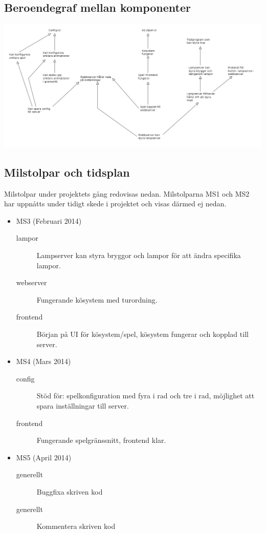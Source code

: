 \documentclass[a4paper,11pt]{article}
\begin{document}
\subsection{Beroendegraf mellan komponenter}

  \begin{center}
    \includegraphics[width=0.9\textheight,angle=90]{task-dependencies.png}
  \end{center}


\subsection{Milstolpar och tidsplan}

  Milstolpar under projektets gång redovisas nedan.  Milstolparna MS1 och MS2
  har uppnåtts under tidigt skede i projektet och visas därmed ej nedan.

  \begin{itemize}
    \item MS3 (Februari 2014)
      \begin{description}
        \item[lampor] Lampserver kan styra bryggor och lampor för att ändra
                      specifika lampor.
        \item[webserver] Fungerande kösystem med turordning.
        \item[frontend] Början på UI för kösystem/spel, kösystem fungerar och
                        kopplad till server.
      \end{description}

    \item MS4 (Mars 2014)
      \begin{description}
        \item[config] Stöd för: spelkonfiguration med fyra i rad och tre i
                      rad, möjlighet att spara inställningar till server.
        \item[frontend] Fungerande spelgränssnitt, frontend klar.
      \end{description}

    \item MS5 (April 2014)
      \begin{description}
        \item[generellt] Buggfixa skriven kod
        \item[generellt] Kommentera skriven kod
      \end{description}
  \end{itemize}
\end{document}
